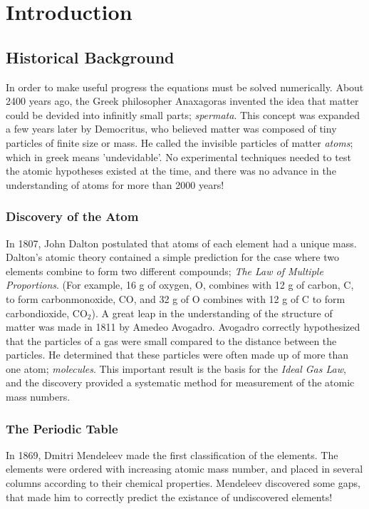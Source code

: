 \chapter{Introduction}
\label{introduction}

\section{Historical Background}

In order to make useful progress the equations must be solved numerically. 
About 2400 years ago, the Greek philosopher Anaxagoras invented the
idea that matter could be devided into infinitly small parts;
\emph{spermata}. 
This concept was expanded a few years later by
Democritus, who believed matter was composed of tiny particles of
finite size or mass. He called the invisible particles of matter
\emph{atoms}; which in greek means 'undevidable'. 
No experimental techniques needed to test the atomic
hypotheses existed at the time, and there was no advance in the
understanding of atoms for more than 2000 years! 

\subsection*{Discovery of the Atom}

In 1807, John Dalton postulated that atoms of each element had a
unique mass. Dalton's atomic theory contained a simple prediction for
the case where two elements combine to form two different compounds;
\emph{The Law of Multiple Proportions}. (For example, 16 g of oxygen, O,
combines with 12 g of carbon, C, to form carbonmonoxide, CO, and
32 g of O combines with 12 g of C to form carbondioxide, CO$_2$).
%
\newline
%
A great leap in the understanding of the structure of matter was made
in 1811 by Amedeo Avogadro. Avogadro correctly hypothesized that the
particles of a gas were small compared to the distance between the
particles. He determined that these particles were often made up of
more than one atom; \emph{molecules}. This important result is the
basis for the \emph{Ideal Gas Law}, and the discovery provided a
systematic method for measurement of the atomic mass numbers.

\subsection*{The Periodic Table}

In 1869, Dmitri Mendeleev made the first classification of the
elements. The elements were ordered with increasing atomic mass
number, and placed in several columns according to their chemical
properties. Mendeleev discovered some gaps, that made him to correctly
predict the existance of undiscovered elements!

